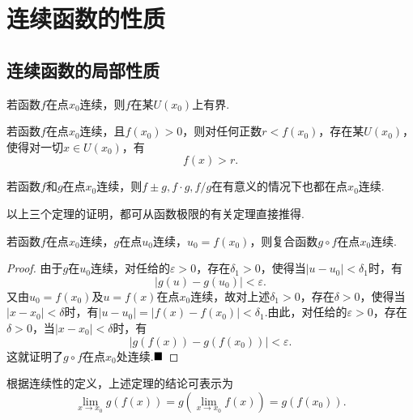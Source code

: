 \section{连续函数的性质}
\subsection{连续函数的局部性质}
\begin{theorem}[局部有界性]
	若函数$f$在点$x_0$连续，则$f$在某$U(x_0)$上有界.
\end{theorem}
\begin{theorem}[局部保号性]
	若函数$f$在点$x_0$连续，且$f(x_0)>0$，则对任何正数$r<f(x_0)$，存在某$U(x_0)$，使得对一切$x\in U(x_0)$，有
	$$f(x)>r.$$
\end{theorem}
\begin{theorem}[四则运算]
	若函数$f$和$g$在点$x_0$连续，则$f\pm g,f\cdot g,f/g$在有意义的情况下也都在点$x_0$连续.
\end{theorem}
以上三个定理的证明，都可从函数极限的有关定理直接推得.
\begin{theorem}[复合函数的连续性]
	若函数$f$在点$x_0$连续，$g$在点$u_0$连续，$u_0=f(x_0)$，则复合函数$g\circ f$在点$x_0$连续. 
\end{theorem}
\begin{proof}
	由于$g$在$u_0$连续，对任给的$\varepsilon>0$，存在$\delta_1>0$，使得当$|u-u_0|<\delta_1$时，有
	$$|g(u)-g(u_0)|<\varepsilon.$$
	又由$u_0=f(x_0)$及$u=f(x)$在点$x_0$连续，故对上述$\delta_1>0$，存在$\delta>0$，使得当$|x-x_0|<\delta$时，有$|u-u_0|=|f(x)-f(x_0)|<\delta_1$.由此，对任给的$\varepsilon>0$，存在$\delta>0$，当$|x-x_0|<\delta$时，有
	$$|g(f(x))-g(f(x_0))|<\varepsilon.$$
	这就证明了$g\circ f$在点$x_0$处连续.$\hfill\blacksquare$
\end{proof}
\begin{remark}
	根据连续性的定义，上述定理的结论可表示为
	$$\lim\limits_{x\to x_0}g(f(x))=g(\lim\limits_{x\to x_0}f(x))=g(f(x_0)).$$
\end{remark}
